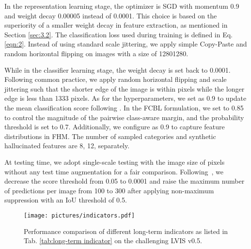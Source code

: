 \documentclass[lettersize,journal]{IEEEtran}
\begin{document}
In the representation learning stage, the optimizer is SGD with momentum 0.9 and weight decay 0.00005 instead of 0.0001.
This choice is based on the superiority of a smaller weight decay in feature extraction, as mentioned in Section \ref{sec:3.2}.
The classification loss used during training is defined in Eq. \eqref{eqn:2}.
Instead of using standard scale jittering, we apply simple Copy-Paste and random horizontal flipping on images with a size of 12801280.



While in the classifier learning stage, the weight decay is set back to 0.0001.
Following common practice, we apply random horizontal flipping and scale jittering such that the shorter edge of the image is within  pixels while the longer edge is less than 1333 pixels.
As for the hyperparameters, we set  as 0.9 to update the mean classification score following \cite{feng2021exploring}.
In the FCBL formulation, we set  to 0.85 to control the magnitude of the pairwise class-aware margin, and the probability threshold  is set to 0.7.
Additionally, we configure  as 0.9 to capture feature distributions in FHM. 
The number of sampled categories  and synthetic hallucinated features  are 8, 12, separately.

At testing time, we adopt single-scale testing with the image size of  pixels without any test time augmentation for a fair comparison.
Following~\cite{gupta2019lvis}, we decrease the score threshold from 0.05 to 0.0001 and raise the maximum number of predictions per image from 100 to 300 after applying non-maximum suppression  with an IoU threshold of 0.5.

\begin{figure}[t]
    \centering
    \texttt{[image: pictures/indicators.pdf]}
    \caption{Performance comparison of different long-term indicators as listed in Tab. \ref{tab:long-term indicator} on the challenging LVIS v0.5.}
    \label{pic:5}
\end{figure}
\end{document}
